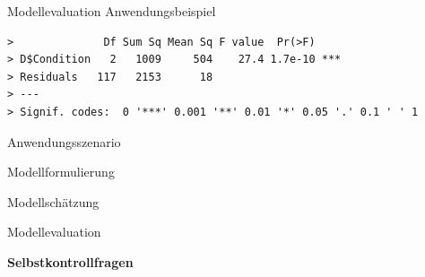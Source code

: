 \documentclass[
  8pt,
  ignorenonframetext,
]{beamer}
\newenvironment{Shaded}{\begin{snugshade}}{\end{snugshade}}
\newcommand{\AttributeTok}[1]{\textcolor[rgb]{0.77,0.63,0.00}{#1}}
\newcommand{\CommentTok}[1]{\textcolor[rgb]{0.56,0.35,0.01}{\textit{#1}}}
\newcommand{\ConstantTok}[1]{\textcolor[rgb]{0.00,0.00,0.00}{#1}}
\newcommand{\FunctionTok}[1]{\textcolor[rgb]{0.00,0.00,0.00}{#1}}
\newcommand{\NormalTok}[1]{#1}
\newcommand{\OtherTok}[1]{\textcolor[rgb]{0.56,0.35,0.01}{#1}}
\newcommand{\SpecialCharTok}[1]{\textcolor[rgb]{0.00,0.00,0.00}{#1}}
\newcommand{\StringTok}[1]{\textcolor[rgb]{0.31,0.60,0.02}{#1}}
\begin{document}
\begin{frame}[fragile]{Modellevaluation}
\protect\hypertarget{modellevaluation-22}{}
Anwendungsbeispiel

\tiny
\vspace{1mm}

\begin{Shaded}
\end{Shaded}

\begin{verbatim}
>              Df Sum Sq Mean Sq F value  Pr(>F)    
> D$Condition   2   1009     504    27.4 1.7e-10 ***
> Residuals   117   2153      18                    
> ---
> Signif. codes:  0 '***' 0.001 '**' 0.01 '*' 0.05 '.' 0.1 ' ' 1
\end{verbatim}

\vfill
\end{frame}

\begin{frame}{}
\protect\hypertarget{section-7}{}
\large
{}
\vfill

Anwendungsszenario

Modellformulierung

Modellschätzung

Modellevaluation

\textbf{Selbstkontrollfragen} \vfill
\end{frame}
\end{document}
